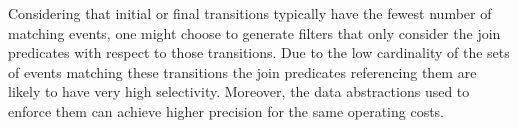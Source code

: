 Considering that initial or final transitions typically have the fewest
number of matching events, one might choose to generate filters that only
consider the join predicates with respect to those transitions.
Due to the low cardinality of the sets of events matching these transitions 
the join predicates referencing them are likely to have very high selectivity.
Moreover, the data abstractions used to enforce them can achieve higher
precision for the same operating costs.












 
